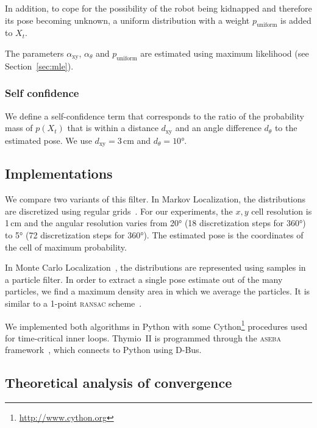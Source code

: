 \documentclass[letterpaper, 10pt, conference]{ieeeconf}
\newcommand{\sect}[1]{Section~\ref{sec:#1}}
\begin{document}
In addition, to cope for the possibility of the robot being kidnapped and therefore its pose becoming unknown, a uniform distribution with a weight $p_\mathrm{uniform}$ is added to $X_t$.

The parameters $\alpha_\mathrm{xy}$, $\alpha_\theta$ and $p_\mathrm{uniform}$ are estimated using maximum likelihood (see \sect{mle}).

\subsubsection{Self confidence}

We define a self-confidence term that corresponds to the ratio of the probability mass of $p(X_t)$ that is within a distance $d_\mathrm{xy}$ and an angle difference $d_\theta$ to the estimated pose.
We use $d_\mathrm{xy} = 3$\,cm and $d_\theta = 10$°.

\subsection{Implementations}

We compare two variants of this filter.
In Markov Localization, the distributions are discretized using regular grids~\cite{fox1999markov}.
For our experiments, the $x,y$ cell resolution is 1\,cm and the angular resolution varies from 20° (18 discretization steps for 360°) to 5° (72 discretization steps for 360°).
The estimated pose is the coordinates of the cell of maximum probability.

In Monte Carlo Localization~\cite{dellaert1999monte}, the distributions are represented using samples in a particle filter.
In order to extract a single pose estimate out of the many particles, we find a maximum density area in which we average the particles.
It is similar to a 1-point \textsc{ransac} scheme~\cite{Fischler1981ransac}.

We implemented both algorithms in Python with some Cython\footnote{\url{http://www.cython.org}} procedures used for time-critical inner loops.
Thymio~II is programmed through the \textsc{aseba} framework~\cite{aseba2011tmech}, which connects to Python using D-Bus.

\subsection{Theoretical analysis of convergence}
\label{sec:theoreticalconv}
\end{document}
